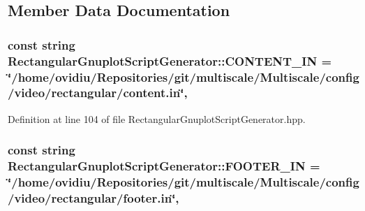 \subsection{Member Data Documentation}
\hypertarget{classmultiscale_1_1video_1_1RectangularGnuplotScriptGenerator_abbd954ff4d68e2a6ef9a7a81f615892c}{
\subsubsection[{C\-O\-N\-T\-E\-N\-T\-\_\-\-I\-N}]{\setlength{\rightskip}{0pt plus 5cm}const string Rectangular\-Gnuplot\-Script\-Generator\-::\-C\-O\-N\-T\-E\-N\-T\-\_\-\-I\-N = \char`\"{}/home/ovidiu/Repositories/git/multiscale/Multiscale/config/video/rectangular/content.\-in\char`\"{}\hspace{0.3cm}{\ttfamily [static]}, {\ttfamily [private]}}}\label{classmultiscale_1_1video_1_1RectangularGnuplotScriptGenerator_abbd954ff4d68e2a6ef9a7a81f615892c}


Definition at line 104 of file Rectangular\-Gnuplot\-Script\-Generator.\-hpp.

\hypertarget{classmultiscale_1_1video_1_1RectangularGnuplotScriptGenerator_a5bff725c865bc3a426351644cee34229}{
\subsubsection[{F\-O\-O\-T\-E\-R\-\_\-\-I\-N}]{\setlength{\rightskip}{0pt plus 5cm}const string Rectangular\-Gnuplot\-Script\-Generator\-::\-F\-O\-O\-T\-E\-R\-\_\-\-I\-N = \char`\"{}/home/ovidiu/Repositories/git/multiscale/Multiscale/config/video/rectangular/footer.\-in\char`\"{}\hspace{0.3cm}{\ttfamily [static]}, {\ttfamily [private]}}}\label{classmultiscale_1_1video_1_1RectangularGnuplotScriptGenerator_a5bff725c865bc3a426351644cee34229}


